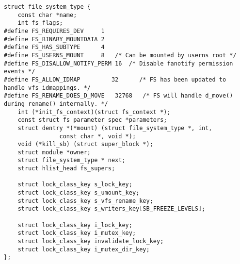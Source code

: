 
\begin{lstlisting}
struct file_system_type {
    const char *name;
    int fs_flags;
#define FS_REQUIRES_DEV		1 
#define FS_BINARY_MOUNTDATA	2
#define FS_HAS_SUBTYPE		4
#define FS_USERNS_MOUNT		8	/* Can be mounted by userns root */
#define FS_DISALLOW_NOTIFY_PERM	16	/* Disable fanotify permission events */
#define FS_ALLOW_IDMAP         32      /* FS has been updated to handle vfs idmappings. */
#define FS_RENAME_DOES_D_MOVE	32768	/* FS will handle d_move() during rename() internally. */
    int (*init_fs_context)(struct fs_context *);
    const struct fs_parameter_spec *parameters;
    struct dentry *(*mount) (struct file_system_type *, int,
                const char *, void *);
    void (*kill_sb) (struct super_block *);
    struct module *owner;
    struct file_system_type * next;
    struct hlist_head fs_supers;

    struct lock_class_key s_lock_key;
    struct lock_class_key s_umount_key;
    struct lock_class_key s_vfs_rename_key;
    struct lock_class_key s_writers_key[SB_FREEZE_LEVELS];

    struct lock_class_key i_lock_key;
    struct lock_class_key i_mutex_key;
    struct lock_class_key invalidate_lock_key;
    struct lock_class_key i_mutex_dir_key;
};
\end{lstlisting}
